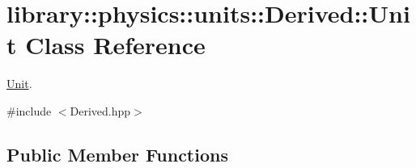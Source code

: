 \hypertarget{classlibrary_1_1physics_1_1units_1_1_derived_1_1_unit}{}\section{library\+:\+:physics\+:\+:units\+:\+:Derived\+:\+:Unit Class Reference}
\label{classlibrary_1_1physics_1_1units_1_1_derived_1_1_unit}


\hyperlink{classlibrary_1_1physics_1_1units_1_1_derived_1_1_unit}{Unit}.  




{\ttfamily \#include $<$Derived.\+hpp$>$}

\subsection*{Public Member Functions}
